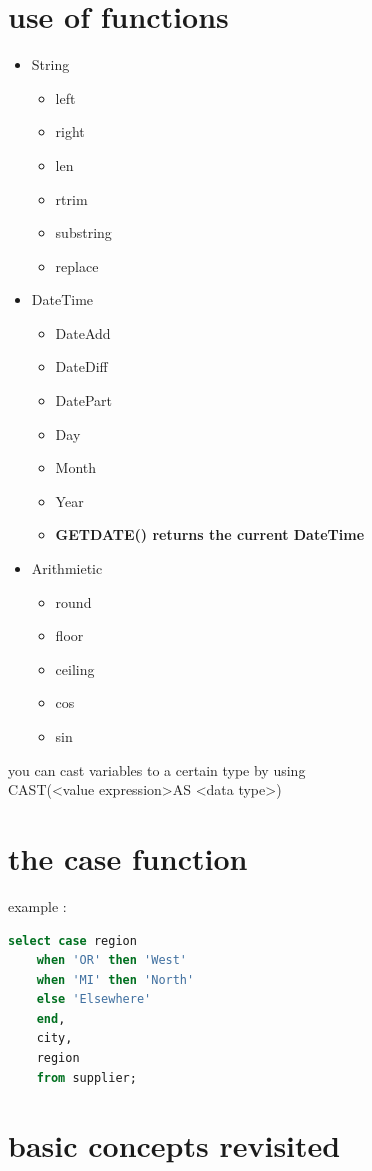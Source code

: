 \documentclass{report}
\begin{document}
	\section{use of functions}
	\begin{itemize}
		\item String
		\begin{itemize}
			\item left
			\item right
			\item len
			\item rtrim
			\item substring
			\item replace
		\end{itemize}
		\item DateTime
		\begin{itemize}
			\item DateAdd
			\item DateDiff
			\item DatePart
			\item Day
			\item Month
			\item Year
			\item \textbf{GETDATE() returns the current DateTime}
		\end{itemize}
		\item Arithmietic
		\begin{itemize}
			\item round
			\item floor
			\item ceiling
			\item cos
			\item sin
		\end{itemize}
	\end{itemize}
	you can cast variables to a certain type by using \\ CAST(\textless value expression\textgreater AS \textless data type\textgreater)
	\section{the case function}
	example : 
	\begin{lstlisting}[language=SQL]
	select case region 
	when 'OR' then 'West' 
	when 'MI' then 'North' 
	else 'Elsewhere' 
	end,
	city,
	region
	from supplier;\end{lstlisting}
	\pagebreak
	\section{basic concepts revisited}
\end{document}
